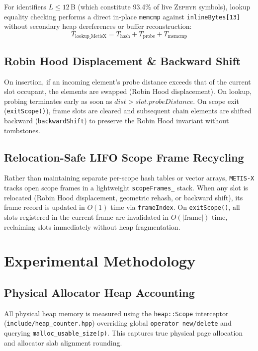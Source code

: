 \documentclass[conference]{IEEEtran}
\begin{document}
For identifiers $L \le 12$\,B (which constitute 93.4\% of live \textsc{Zephyr} symbols), lookup equality checking performs a direct in-place \texttt{memcmp} against \texttt{inlineBytes[13]} without secondary heap dereferences or buffer reconstruction:
\begin{equation}
T_{\text{lookup\_MetisX}} = T_{\text{hash}} + T_{\text{probe}} + T_{\text{memcmp}}
\end{equation}

\subsection{Robin Hood Displacement \& Backward Shift}
On insertion, if an incoming element's probe distance exceeds that of the current slot occupant, the elements are swapped (Robin Hood displacement). On lookup, probing terminates early as soon as $dist > slot.probeDistance$. On scope exit (\texttt{exitScope()}), frame slots are cleared and subsequent chain elements are shifted backward (\texttt{backwardShift}) to preserve the Robin Hood invariant without tombstones.

\subsection{Relocation-Safe LIFO Scope Frame Recycling}
Rather than maintaining separate per-scope hash tables or vector arrays, \texttt{METIS-X} tracks open scope frames in a lightweight \texttt{scopeFrames\_} stack. When any slot is relocated (Robin Hood displacement, geometric rehash, or backward shift), its frame record is updated in $O(1)$ time via \texttt{frameIndex}. On \texttt{exitScope()}, all slots registered in the current frame are invalidated in $O(|\text{frame}|)$ time, reclaiming slots immediately without heap fragmentation.

\section{Experimental Methodology}

\subsection{Physical Allocator Heap Accounting}
All physical heap memory is measured using the \texttt{heap::Scope} interceptor (\texttt{include/heap\_counter.hpp}) overriding global \texttt{operator new/delete} and querying \texttt{malloc\_usable\_size(p)}. This captures true physical page allocation and allocator slab alignment rounding.
\end{document}
